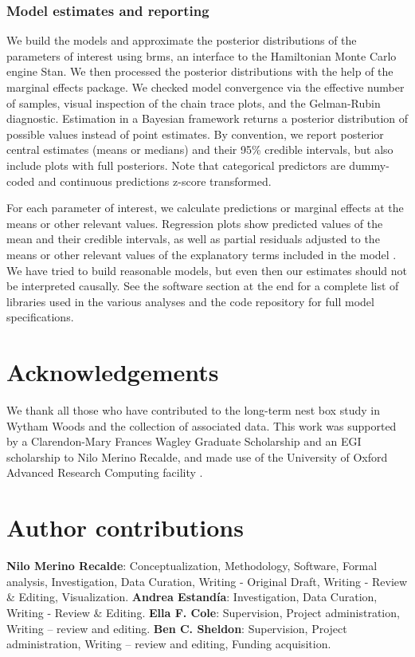 \documentclass[9pt, twocolumn, twoside]{gsajnl}
\begin{document}
\subsubsection{Model estimates and reporting}

We build the models and approximate the posterior distributions of the parameters of interest using brms, an interface to the Hamiltonian Monte Carlo engine Stan. We then processed the posterior distributions with the help of the marginal effects package. We checked model convergence via the effective number of samples, visual inspection of the chain trace plots, and the Gelman-Rubin diagnostic. Estimation in a Bayesian framework returns a posterior distribution of possible values instead of point estimates. By convention, we report posterior central estimates (means or medians) and their 95\% credible intervals, but also include plots with full posteriors. Note that categorical predictors are dummy-coded and continuous predictions z-score transformed.

For each parameter of interest, we calculate predictions or marginal effects at the means or other relevant values.  Regression plots show predicted values of the mean and their credible intervals, as well as partial residuals adjusted to the means or other relevant values of the explanatory terms included in the model \parencite{fox2018, larsen1972}. We have tried to build reasonable models, but even then our estimates should not be interpreted causally. See the software section at the end for a complete list of libraries used in the various analyses and the code repository for full model specifications.

\section{Acknowledgements}

We thank all those who have contributed to the long-term nest box study in Wytham Woods and the collection of associated data. This work was supported by a Clarendon-Mary Frances Wagley Graduate Scholarship and an EGI scholarship to Nilo Merino Recalde, and made use of the University of Oxford Advanced Research Computing facility \parencite{richards2015}.

\section{Author contributions}
\textbf{Nilo Merino Recalde}: Conceptualization, Methodology, Software, Formal analysis, Investigation, Data Curation, Writing - Original Draft, Writing - Review \& Editing, Visualization. 
\textbf{Andrea Estandía}: Investigation, Data Curation, Writing - Review \& Editing.
\textbf{Ella F. Cole}: Supervision, Project administration, Writing -- review and editing.
\textbf{Ben C. Sheldon}: Supervision, Project administration, Writing -- review and editing, Funding acquisition.
\end{document}
